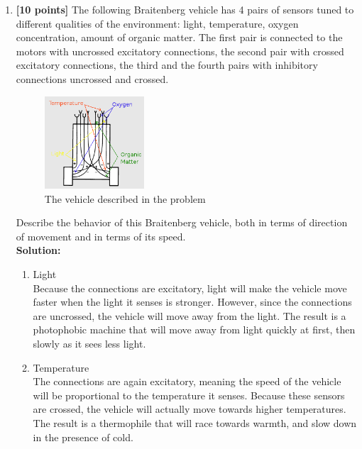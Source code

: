 \documentclass{article}
\begin{document}
\begin{enumerate}
\begin{enumerate}
    \end{enumerate}


\newpage
\item \textbf{[10 points]} The following Braitenberg vehicle has 4 pairs of sensors tuned to different qualities of the environment: light, temperature, oxygen concentration, amount of organic matter. The first pair is connected to the motors with uncrossed excitatory connections, the second pair with crossed excitatory connections, the third and the fourth pairs with inhibitory connections uncrossed and crossed. \\
    \begin{figure}[h!]
    \centering
    \includegraphics[width = 0.35\textwidth]{Braitenburg_vehicle}
    \caption{The vehicle described in the problem}
    \label{fig:Braitenburg_vehicle}
    \end{figure}
\newline
Describe the behavior of this Braitenberg vehicle, both in terms of direction of movement and in terms of its speed. \\ 

\textbf{Solution:} 
    \begin{enumerate}
    \item Light \\
    Because the connections are excitatory, light will make the vehicle move faster when the light it senses is stronger. However, since the connections are uncrossed, the vehicle will move away from the light. The result is a photophobic machine that will move away from light quickly at first, then slowly as it sees less light.

    \item Temperature \\
    The connections are again excitatory, meaning the speed of the vehicle will be proportional to the temperature it senses. Because these sensors are crossed, the vehicle will actually move towards higher temperatures. The result is a thermophile that will race towards warmth, and slow down in the presence of cold.


\end{enumerate}
\end{enumerate}
\end{document}

